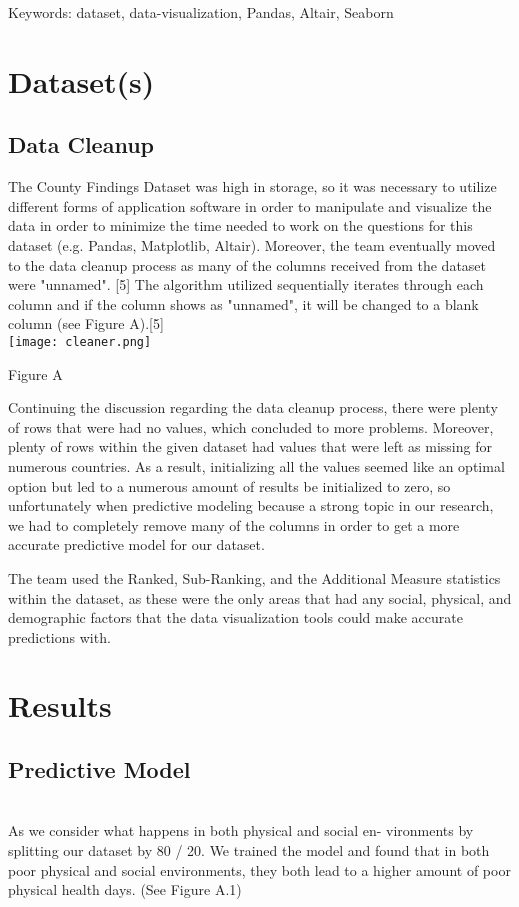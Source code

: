 \documentclass[conference]{IEEEtran}
\begin{document}
Keywords: dataset, data-visualization, Pandas, Altair, Seaborn\\

\section{Dataset(s)}

\subsection{Data Cleanup}
The County Findings Dataset was high in storage, so it was necessary to utilize different forms of application software in order to manipulate and visualize the data in order to minimize the time needed to work on the questions for this dataset (e.g. Pandas, Matplotlib, Altair). Moreover, the team eventually moved to the data cleanup process as many of the columns received from the dataset were "unnamed". [5] The algorithm utilized
sequentially iterates through each column and if the column shows as "unnamed", it will be
changed to a blank column (see Figure A).[5]\\
\texttt{[image: cleaner.png]}
\begin{center}
\footnotesize{Figure A}    
\end{center}

Continuing the discussion regarding the data cleanup process, there were plenty of rows that were had no values, which concluded to more problems. Moreover, plenty of rows within the given dataset had values that were left as missing for numerous
countries. As a result, initializing all the values seemed like an optimal option but
led to a numerous amount of results be initialized to zero, so unfortunately when predictive modeling because a strong topic in our research, we had to completely
remove many of the columns in order to get a more accurate predictive model for our dataset.

The team used the Ranked, Sub-Ranking, and the Additional Measure statistics within the dataset, as these were the only areas that had
any social, physical, and demographic factors that the data visualization tools could make accurate predictions with.

\section{Results}

\subsection{Predictive Model}\\
As we consider what happens in both physical and social en-
vironments by splitting our dataset by 80 / 20. We trained
the model and found that in both poor physical and social
environments, they both
lead to a higher amount of poor physical health days. (See Figure A.1)\\
\end{document}
